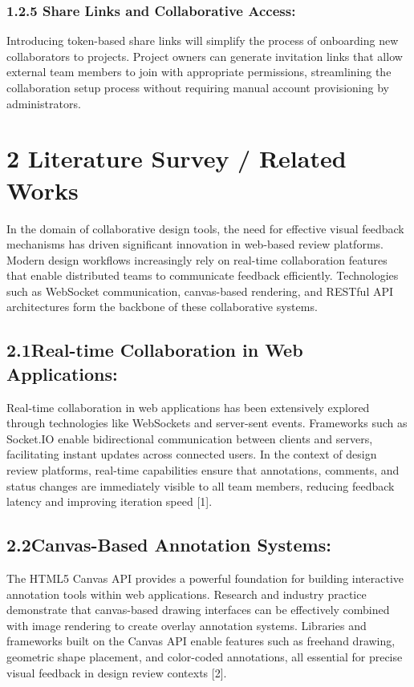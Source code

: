 \documentclass[12pt,a4paper]{article}
\begin{document}
\subsubsection{1.2.5 Share Links and Collaborative Access:}

Introducing token-based share links will simplify the process of onboarding new collaborators to projects. Project owners can generate invitation links that allow external team members to join with appropriate permissions, streamlining the collaboration setup process without requiring manual account provisioning by administrators.

\section{2 Literature Survey / Related Works}

In the domain of collaborative design tools, the need for effective visual feedback mechanisms has driven significant innovation in web-based review platforms. Modern design workflows increasingly rely on real-time collaboration features that enable distributed teams to communicate feedback efficiently. Technologies such as WebSocket communication, canvas-based rendering, and RESTful API architectures form the backbone of these collaborative systems.

\subsection{2.1\quad Real-time Collaboration in Web Applications:}

Real-time collaboration in web applications has been extensively explored through technologies like WebSockets and server-sent events. Frameworks such as Socket.IO enable bidirectional communication between clients and servers, facilitating instant updates across connected users. In the context of design review platforms, real-time capabilities ensure that annotations, comments, and status changes are immediately visible to all team members, reducing feedback latency and improving iteration speed [1].

\subsection{2.2\quad Canvas-Based Annotation Systems:}

The HTML5 Canvas API provides a powerful foundation for building interactive annotation tools within web applications. Research and industry practice demonstrate that canvas-based drawing interfaces can be effectively combined with image rendering to create overlay annotation systems. Libraries and frameworks built on the Canvas API enable features such as freehand drawing, geometric shape placement, and color-coded annotations, all essential for precise visual feedback in design review contexts [2].
\end{document}
